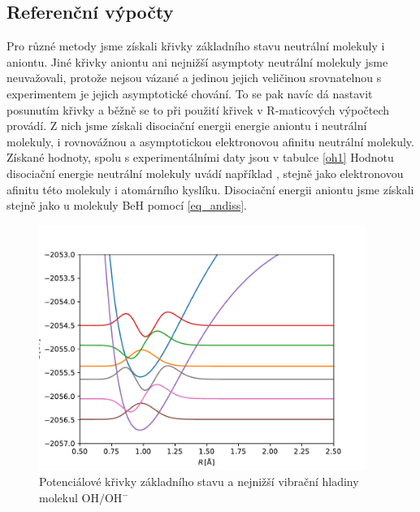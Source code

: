 \subsection{Referenční výpočty}
Pro různé metody jsme získali křivky základního stavu neutrální molekuly i aniontu. 
Jiné křivky aniontu ani nejnižší asymptoty neutrální molekuly jsme neuvažovali, protože 
nejsou vázané a jedinou jejich veličinou srovnatelnou s experimentem je jejich 
asymptotické chování. To se pak navíc dá nastavit posunutím křivky a běžně se to při 
použití křivek v R-maticových výpočtech provádí.
Z nich jsme získali
disociační energii energie aniontu i neutrální molekuly, i rovnovážnou a asymptotickou 
elektronovou afinitu neutrální molekuly. Získané hodnoty, spolu s experimentálními daty 
jsou v tabulce \ref{oh1}
Hodnotu disociační energie neutrální molekuly uvádí například \cite{CRC_Handbook90}, 
stejně jako elektronovou afinitu této molekuly i atomárního kyslíku. Disociační energii 
aniontu jsme získali stejně jako u molekuly BeH pomocí \ref{eq_andiss}.

\begin{figure}
\centering
\includegraphics[width=0.95\textwidth]{../img/OH-vibr1.pdf}
\caption{Potenciálové křivky základního stavu a nejnižší vibrační hladiny molekul $\mathrm{OH/OH^-}$ \label{VibrOH1}}
\end{figure}



